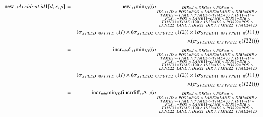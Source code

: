 \begin{eqnarray*}
\algnew_{+I} Accident.id1[d, s, p] &=& \algnew_{+I} \algmin_{ID} (
(\sigma_{ \substack{DIR = d \;\wedge\; SEG = s \;\wedge\; POS = p \;\wedge\; \\ID2 <> ID \;\wedge\; POS2 = POS \;\wedge\; LANE2 = LANE \;\wedge\; DIR2 = DIR \;\wedge\; \\ TIME2 >= TIME \;\wedge\; TIME2 <= TIME + 30 \;\wedge\; ID11 = ID \;\wedge\;\\ POS11 = POS \;\wedge\;  LANE11 = LANE \;\wedge\; DIR11=DIR \;\wedge\; \\TIME11 = TIME + 120 \;\wedge\; ID22 = ID2 \;\wedge\; POS22 = POS \;\wedge\; \\ LANE22 = LANE \;\wedge\; DIR22 = DIR \;\wedge\; TIME22 = TIME2 + 120}} \\
&& (\sigma_{SPEED = 0 \wedge TYPE = 0} (I) \times (\sigma_{SPEED2 = 0 \wedge TYPE2 = 0} (I2)) \times (\sigma_{SPEED11 = 0 \wedge TYPE11 = 0} (I11)) \\
&&\times (\sigma_{SPEED22 = 0 \wedge TYPE22 = 0} (I22)) ) )\\
%
&=& \algincr_{min} \delta_{+I} \algmin_{ID} (
(\sigma_{ \substack{DIR = d \;\wedge\; SEG = s \;\wedge\; POS = p \;\wedge\; \\ID2 <> ID \;\wedge\; POS2 = POS \;\wedge\; LANE2 = LANE \;\wedge\; DIR2 = DIR \;\wedge\; \\ TIME2 >= TIME \;\wedge\; TIME2 <= TIME + 30 \;\wedge\; ID11 = ID \;\wedge\;\\ POS11 = POS \;\wedge\;  LANE11 = LANE \;\wedge\; DIR11=DIR \;\wedge\; \\TIME11 = TIME + 120 \;\wedge\; ID22 = ID2 \;\wedge\; POS22 = POS \;\wedge\; \\ LANE22 = LANE \;\wedge\; DIR22 = DIR \;\wedge\; TIME22 = TIME2 + 120}} \\
&& (\sigma_{SPEED = 0 \wedge TYPE = 0} (I) \times (\sigma_{SPEED2 = 0 \wedge TYPE2 = 0} (I2)) \times (\sigma_{SPEED11 = 0 \wedge TYPE11 = 0} (I11)) \\
&&\times (\sigma_{SPEED22 = 0 \wedge TYPE22 = 0} (I22)) ) )\\
%
&=& \algincr_{min} \algmin_{ID} (\algincrdiff_{\cup} \Delta_{+I}
(\sigma_{ \substack{DIR = d \;\wedge\; SEG = s \;\wedge\; POS = p \;\wedge\; \\ID2 <> ID \;\wedge\; POS2 = POS \;\wedge\; LANE2 = LANE \;\wedge\; DIR2 = DIR \;\wedge\; \\ TIME2 >= TIME \;\wedge\; TIME2 <= TIME + 30 \;\wedge\; ID11 = ID \;\wedge\;\\ POS11 = POS \;\wedge\;  LANE11 = LANE \;\wedge\; DIR11=DIR \;\wedge\; \\TIME11 = TIME + 120 \;\wedge\; ID22 = ID2 \;\wedge\; POS22 = POS \;\wedge\; \\ LANE22 = LANE \;\wedge\; DIR22 = DIR \;\wedge\; TIME22 = TIME2 + 120}} \\

\end{eqnarray*}
